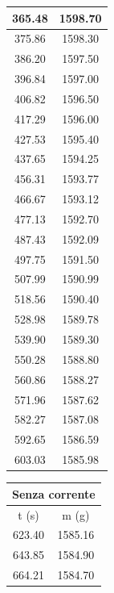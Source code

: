 \documentclass[a4paper,12pt]{article}
\begin{document}
\begin{table}[H]
\begin{minipage}[t]{0.30\textwidth}
\begin{tabular}{|c|c|}
            365.48 & 1598.70 \\ \hline
            375.86 & 1598.30 \\ \hline
            386.20 & 1597.50 \\ \hline
            396.84 & 1597.00 \\ \hline
            406.82 & 1596.50 \\ \hline
            417.29 & 1596.00 \\ \hline
            427.53 & 1595.40 \\ \hline
            437.65 & 1594.25 \\ \hline
            456.31 & 1593.77 \\ \hline
            466.67 & 1593.12 \\ \hline
            477.13 & 1592.70 \\ \hline
            487.43 & 1592.09 \\ \hline
            497.75 & 1591.50 \\ \hline
            507.99 & 1590.99 \\ \hline
            518.56 & 1590.40 \\ \hline
            528.98 & 1589.78 \\ \hline
            539.90 & 1589.30 \\ \hline
            550.28 & 1588.80 \\ \hline
            560.86 & 1588.27 \\ \hline
            571.96 & 1587.62 \\ \hline
            582.27 & 1587.08 \\ \hline
            592.65 & 1586.59 \\ \hline
            603.03 & 1585.98 \\ \hline
        \end{tabular}
    \end{minipage}
    \hfill
    \begin{minipage}[t]{0.30\textwidth}
        \vspace{0pt}
        \centering
        \begin{tabular}{|c|c|}
            \hline
            \multicolumn{2}{|c|}{\textbf{Senza corrente}} \\ \hline
            t (s) & m (g) \\ \hline
            623.40 & 1585.16 \\ \hline
            643.85 & 1584.90 \\ \hline
            664.21 & 1584.70 \\ \hline

\end{tabular}
\end{minipage}
\end{table}
\end{document}
